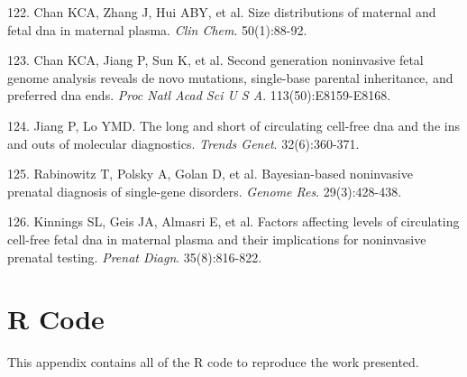 \documentclass[11pt,letterpaper]{book}
\begin{document}
\leavevmode\hypertarget{ref-chan:2004aa}{}%
122. Chan KCA, Zhang J, Hui ABY, et al. Size distributions of maternal and fetal dna in maternal plasma. \emph{Clin Chem}. 50(1):88-92.

\leavevmode\hypertarget{ref-chan:2016aa}{}%
123. Chan KCA, Jiang P, Sun K, et al. Second generation noninvasive fetal genome analysis reveals de novo mutations, single-base parental inheritance, and preferred dna ends. \emph{Proc Natl Acad Sci U S A}. 113(50):E8159-E8168.

\leavevmode\hypertarget{ref-jiang:2016ab}{}%
124. Jiang P, Lo YMD. The long and short of circulating cell-free dna and the ins and outs of molecular diagnostics. \emph{Trends Genet}. 32(6):360-371.

\leavevmode\hypertarget{ref-rabinowitz:2019aa}{}%
125. Rabinowitz T, Polsky A, Golan D, et al. Bayesian-based noninvasive prenatal diagnosis of single-gene disorders. \emph{Genome Res}. 29(3):428-438.

\leavevmode\hypertarget{ref-kinnings:2015aa}{}%
126. Kinnings SL, Geis JA, Almasri E, et al. Factors affecting levels of circulating cell-free fetal dna in maternal plasma and their implications for noninvasive prenatal testing. \emph{Prenat Diagn}. 35(8):816-822.

\hypertarget{appendix-appendix}{%
\appendix}


\hypertarget{r-code}{%
\chapter{R Code}\label{r-code}}

This appendix contains all of the R code to reproduce the work presented.
\end{document}
